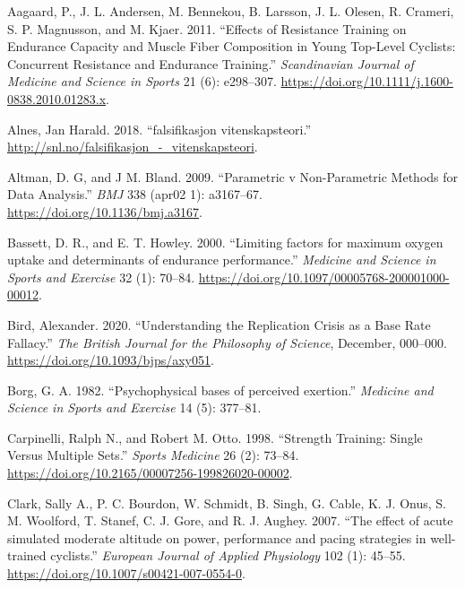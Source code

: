 \documentclass[
]{book}
\newlength{\cslhangindent}
\newlength{\cslentryspacingunit} %
\newenvironment{CSLReferences}[2] %
 {%
  \setlength{\parindent}{0pt}
  \ifodd #1
  \let\oldpar\par
  \def\par{\hangindent=\cslhangindent\oldpar}
  \fi
  \setlength{\parskip}{#2\cslentryspacingunit}
 }%
 {}
\begin{document}
\hypertarget{refs}{}
\begin{CSLReferences}{1}{0}
\leavevmode{}%
Aagaard, P., J. L. Andersen, M. Bennekou, B. Larsson, J. L. Olesen, R.
Crameri, S. P. Magnusson, and M. Kjaer. 2011. {``Effects of Resistance
Training on Endurance Capacity and Muscle Fiber Composition in Young
Top-Level Cyclists: Concurrent Resistance and Endurance Training.''}
\emph{Scandinavian Journal of Medicine and Science in Sports} 21 (6):
e298--307. \url{https://doi.org/10.1111/j.1600-0838.2010.01283.x}.

\leavevmode{}%
Alnes, Jan Harald. 2018. {``falsifikasjon {\textendash}
vitenskapsteori.''} \url{http://snl.no/falsifikasjon_-_vitenskapsteori}.

\leavevmode{}%
Altman, D. G, and J M. Bland. 2009. {``Parametric v Non-Parametric
Methods for Data Analysis.''} \emph{BMJ} 338 (apr02 1): a3167--67.
\url{https://doi.org/10.1136/bmj.a3167}.

\leavevmode{}%
Bassett, D. R., and E. T. Howley. 2000. {``Limiting factors for maximum
oxygen uptake and determinants of endurance performance.''}
\emph{Medicine and Science in Sports and Exercise} 32 (1): 70--84.
\url{https://doi.org/10.1097/00005768-200001000-00012}.

\leavevmode{}%
Bird, Alexander. 2020. {``Understanding the Replication Crisis as a Base
Rate Fallacy.''} \emph{The British Journal for the Philosophy of
Science}, December, 000--000. \url{https://doi.org/10.1093/bjps/axy051}.

\leavevmode{}%
Borg, G. A. 1982. {``Psychophysical bases of perceived exertion.''}
\emph{Medicine and Science in Sports and Exercise} 14 (5): 377--81.

\leavevmode{}%
Carpinelli, Ralph N., and Robert M. Otto. 1998. {``Strength Training:
Single Versus Multiple Sets.''} \emph{Sports Medicine} 26 (2): 73--84.
\url{https://doi.org/10.2165/00007256-199826020-00002}.

\leavevmode{}%
Clark, Sally A., P. C. Bourdon, W. Schmidt, B. Singh, G. Cable, K. J.
Onus, S. M. Woolford, T. Stanef, C. J. Gore, and R. J. Aughey. 2007.
{``The effect of acute simulated moderate altitude on power, performance
and pacing strategies in well-trained cyclists.''} \emph{European
Journal of Applied Physiology} 102 (1): 45--55.
\url{https://doi.org/10.1007/s00421-007-0554-0}.


\end{CSLReferences}
\end{document}
